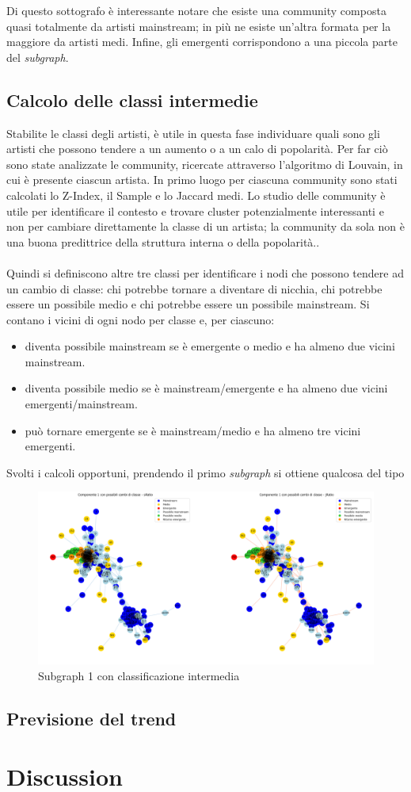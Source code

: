 \documentclass[sigchi]{acmart}
\begin{document}
\noindent Di questo sottografo è interessante notare che esiste una community composta quasi totalmente da artisti mainstream; in più ne esiste un'altra formata per la maggiore da artisti medi. Infine, gli emergenti corrispondono a una piccola parte del {\itshape subgraph}.

\subsection{Calcolo delle classi intermedie}

Stabilite le classi degli artisti, è utile in questa fase individuare quali sono gli artisti che possono tendere a un aumento o a un calo di popolarità. Per far ciò sono state analizzate le community, ricercate attraverso l'algoritmo di Louvain, in cui è presente ciascun artista. In primo luogo per ciascuna community sono stati calcolati lo Z-Index, il Sample e lo Jaccard medi. Lo studio delle community è utile per identificare il contesto e trovare cluster potenzialmente interessanti e non per cambiare direttamente la classe di un artista; la community da sola non è una buona predittrice della struttura interna o della popolarità..
 \\ \\ Quindi si definiscono altre tre classi per identificare i nodi che possono tendere ad un cambio di classe: chi potrebbe tornare a diventare di nicchia, chi potrebbe essere un possibile medio e chi potrebbe essere un possibile mainstream. Si contano i vicini di ogni nodo per classe e, per ciascuno:

\begin{itemize}
\item diventa possibile mainstream se è emergente o medio e ha almeno due vicini mainstream.
\item diventa possibile medio se è mainstream/emergente e ha almeno due vicini emergenti/mainstream.
\item può tornare emergente se è mainstream/medio e ha almeno tre vicini emergenti.
\end{itemize}

Svolti i calcoli opportuni, prendendo il primo {\itshape subgraph} si ottiene qualcosa del tipo

\begin{figure}[H]
\centering
\includegraphics[width=0.45
\textwidth]{../open_problem/plots/3_3/subClSubgr_1.png}
\caption{Subgraph 1 con classificazione intermedia}
\label{fig:subClSubgr_1}
\end{figure}

\subsection{Previsione del trend}


\section{Discussion}




\end{document}
